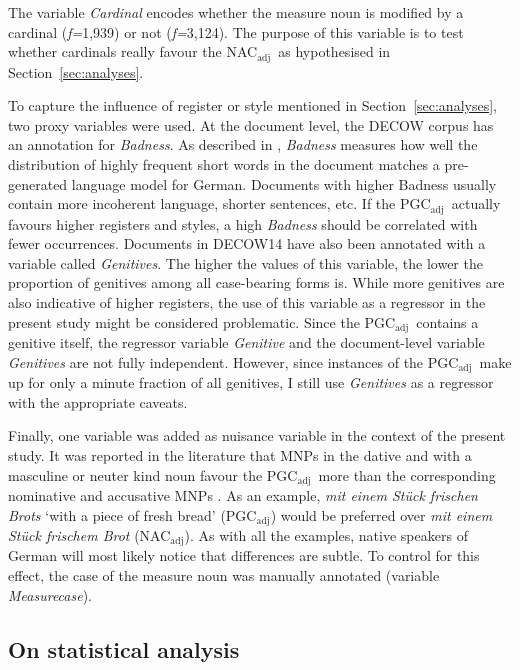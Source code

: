 \documentclass[USenglish]{article}
\newcommand{\Sub}[1]{\ensuremath{\mathrm{_{#1}}}}
\newcommand{\NACa}{NAC\Sub{adj}}
\newcommand{\PGCa}{PGC\Sub{adj}}
\begin{document}
The variable \textit{Cardinal} encodes whether the measure noun is modified by a cardinal (\textit{f=}1,939) or not (\textit{f=}3,124).
The purpose of this variable is to test whether cardinals really favour the \NACa\ as hypothesised in Section~\ref{sec:analyses}.

To capture the influence of register or style mentioned in Section~\ref{sec:analyses}, two proxy variables were used.
At the document level, the DECOW corpus has an annotation for \textit{Badness}.
As described in \cite{SchaeferEa2013}, \textit{Badness} measures how well the distribution of highly frequent short words in the document matches a pre-generated language model for German.
Documents with higher Badness usually contain more incoherent language, shorter sentences, etc.
If the \PGCa\ actually favours higher registers and styles, a high \textit{Badness} should be correlated with fewer occurrences.
Documents in DECOW14 have also been annotated with a variable called \textit{Genitives}.
The higher the values of this variable, the lower the proportion of genitives among all case-bearing forms is.
While more genitives are also indicative of higher registers, the use of this variable as a regressor in the present study might be considered problematic.
Since the \PGCa\ contains a genitive itself, the regressor variable \textit{Genitive} and the document-level variable \textit{Genitives} are not fully independent.
However, since instances of the \PGCa\ make up for only a minute fraction of all genitives, I still use \textit{Genitives} as a regressor with the appropriate caveats.

Finally, one variable was added as nuisance variable in the context of the present study.
It was reported in the literature that MNPs in the dative and with a masculine or neuter kind noun favour the \PGCa\ more than the corresponding nominative and accusative MNPs \citep{Hentschel1993,Zimmer2015}.
As an example, \textit{mit einem Stück frischen Brots} `with a piece of fresh bread' (\PGCa) would be preferred over \textit{mit einem Stück frischem Brot} (\NACa).
As with all the examples, native speakers of German will most likely notice that differences are subtle.
To control for this effect, the case of the measure noun was manually annotated (variable \textit{Measurecase}).



\subsection{On statistical analysis}
\label{sec:rightstatistics}
\end{document}
